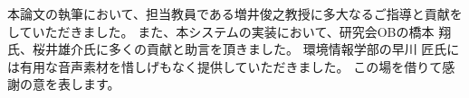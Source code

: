 \begin{acknowledgment}

本論文の執筆において、担当教員である増井俊之教授に多大なるご指導と貢献をしていただきました。
また、本システムの実装において、研究会OBの橋本 翔氏、桜井雄介氏に多くの貢献と助言を頂きました。
環境情報学部の早川 匠氏には有用な音声素材を惜しげもなく提供していただきました。
この場を借りて感謝の意を表します。

\end{acknowledgment}
